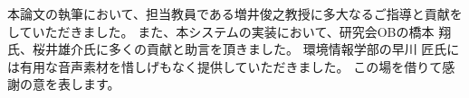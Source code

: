 \begin{acknowledgment}

本論文の執筆において、担当教員である増井俊之教授に多大なるご指導と貢献をしていただきました。
また、本システムの実装において、研究会OBの橋本 翔氏、桜井雄介氏に多くの貢献と助言を頂きました。
環境情報学部の早川 匠氏には有用な音声素材を惜しげもなく提供していただきました。
この場を借りて感謝の意を表します。

\end{acknowledgment}
